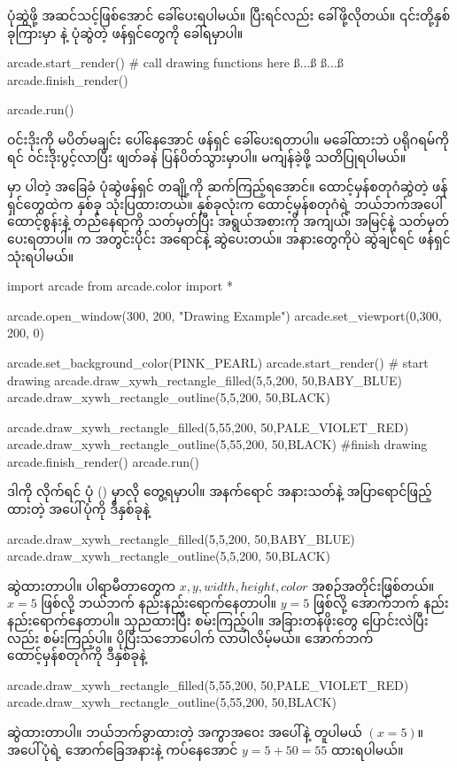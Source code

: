 ပုံဆွဲဖို့ အဆင်သင့်ဖြစ်အောင်  ခေါ်ပေးရပါမယ်။ ပြီးရင်လည်း  ခေါ်ဖို့လိုတယ်။ ၎င်းတို့နှစ်ခုကြားမှာ  နဲ့ ပုံဆွဲတဲ့ ဖန်ရှင်တွေကို  ခေါ်ရမှာပါ။
%
\begin{py}
arcade.start_render()
# call drawing functions here
ß$\ldots$ß
ß$\ldots$ß
arcade.finish_render()
\end{py}
%
\betweenminted{\medskipamount}
%
\begin{py}
arcade.run()
\end{py}
%
ဝင်းဒိုးကို မပိတ်မချင်း ပေါ်နေအောင်  ဖန်ရှင် ခေါ်ပေးရတာပါ။ မခေါ်ထားဘဲ ပရိုဂရမ်ကို  ရင် ဝင်းဒိုးပွင့်လာပြီး ဖျတ်ခနဲ ပြန်ပိတ်သွားမှာပါ။ မကျန်ခဲ့ဖို့ သတိပြုရပါမယ်။

 မှာ ပါတဲ့ အခြေခံ ပုံဆွဲဖန်ရှင် တချို့ကို ဆက်ကြည့်ရအောင်။ ထောင့်မှန်စတုဂံဆွဲတဲ့ ဖန်ရှင်တွေထဲက နှစ်ခု သုံးပြထားတယ်။ နှစ်ခုလုံးက  ထောင့်မှန်စတုဂံရဲ့ ဘယ်ဘက်အပေါ်ထောင့်စွန်းနဲ့ တည်နေရာကို သတ်မှတ်ပြီး အရွယ်အစားကို အကျယ်၊ အမြင့်နဲ့ သတ်မှတ်ပေးရတာပါ။   က အတွင်းပိုင်း အရောင်နဲ့ ဆွဲပေးတယ်။ အနားတွေကိုပဲ ဆွဲချင်ရင်  ဖန်ရှင်သုံးရပါမယ်။
%
\begin{py}
import arcade
from arcade.color import *

arcade.open_window(300, 200, "Drawing Example")
arcade.set_viewport(0,300, 200, 0)

arcade.set_background_color(PINK_PEARL)
arcade.start_render()
# start drawing
arcade.draw_xywh_rectangle_filled(5,5,200, 50,BABY_BLUE)
arcade.draw_xywh_rectangle_outline(5,5,200, 50,BLACK)

arcade.draw_xywh_rectangle_filled(5,55,200, 50,PALE_VIOLET_RED)
arcade.draw_xywh_rectangle_outline(5,55,200, 50,BLACK)
#finish drawing
arcade.finish_render()
arcade.run()
\end{py}
%
ဒါကို  လိုက်ရင် ပုံ (\fRefNo{\ref{fig:ch07rects}}) မှာလို တွေ့ရမှာပါ။ အနက်ရောင် အနားသတ်နဲ့ အပြာရောင်ဖြည့်ထားတဲ့ အပေါ်ပုံကို ဒီနှစ်ခုနဲ့ 
%
\begin{py}
arcade.draw_xywh_rectangle_filled(5,5,200, 50,BABY_BLUE)
arcade.draw_xywh_rectangle_outline(5,5,200, 50,BLACK)
\end{py}
%
ဆွဲထားတာပါ။ ပါရာမီတာတွေက $x, y, width, height, color$ အစဉ်အတိုင်းဖြစ်တယ်။ $x = 5$ ဖြစ်လို့ ဘယ်ဘက် နည်းနည်းရောက်နေတာပါ။ $y = 5$ ဖြစ်လို့ အောက်ဘက် နည်းနည်းရောက်နေတာပါ။ သုညထားပြီး စမ်းကြည့်ပါ။ အခြားတန်ဖိုးတွေ ပြောင်းလဲပြီးလည်း စမ်းကြည့်ပါ။ ပိုပြီးသဘောပေါက် လာပါလိမ့်မယ်။ အောက်ဘက် ထောင့်မှန်စတုဂံကို ဒီနှစ်ခုနဲ့
%
\begin{py}
arcade.draw_xywh_rectangle_filled(5,55,200, 50,PALE_VIOLET_RED)
arcade.draw_xywh_rectangle_outline(5,55,200, 50,BLACK)
\end{py}
%
ဆွဲထားတာပါ။ ဘယ်ဘက်ခွာထားတဲ့ အကွာအဝေး အပေါ်နဲ့ တူပါမယ် $(x = 5)$။ အပေါ်ပုံရဲ့ အောက်ခြေအနားနဲ့ ကပ်နေအောင် $y = 5 + 50 = 55$ ထားရပါမယ်။



